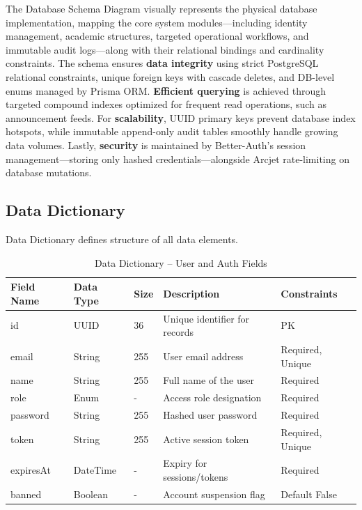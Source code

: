 The Database Schema Diagram visually represents the physical database implementation, mapping the core system modules—including identity management, academic structures, targeted operational workflows, and immutable audit logs—along with their relational bindings and cardinality constraints. The schema ensures \textbf{data integrity} using strict PostgreSQL relational constraints, unique foreign keys with cascade deletes, and DB-level enums managed by Prisma ORM. \textbf{Efficient querying} is achieved through targeted compound indexes optimized for frequent read operations, such as announcement feeds. For \textbf{scalability}, UUID primary keys prevent database index hotspots, while immutable append-only audit tables smoothly handle growing data volumes. Lastly, \textbf{security} is maintained by Better-Auth's session management—storing only hashed credentials—alongside Arcjet rate-limiting on database mutations.


\subsection{Data Dictionary}

Data Dictionary defines structure of all data elements.

\begin{table}[H]
\centering
\caption{Data Dictionary – User and Auth Fields}
\begin{tabularx}{\textwidth}{|p{2.5cm}|p{2cm}|p{1.2cm}|X|p{2.5cm}|}
\hline
\textbf{Field Name} & \textbf{Data Type} & \textbf{Size} & \textbf{Description} & \textbf{Constraints} \\
\hline
id & UUID & 36 & Unique identifier for records & PK \\
\hline
email & String & 255 & User email address & Required, Unique \\
\hline
name & String & 255 & Full name of the user & Required \\
\hline
role & Enum & - & Access role designation & Required \\
\hline
password & String & 255 & Hashed user password & Required \\
\hline
token & String & 255 & Active session token & Required, Unique \\
\hline
expiresAt & DateTime & - & Expiry for sessions/tokens & Required \\
\hline
banned & Boolean & - & Account suspension flag & Default False \\
\hline
\end{tabularx}
\end{table}

